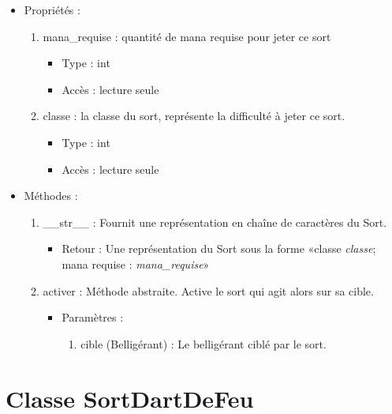 \documentclass[12pt,pdftex,oneside]{article}
\begin{document}
  \begin{itemize}
  \item Propriétés : 
    \begin{enumerate}
    \item mana\_requise : quantité de mana requise pour jeter ce sort
          \begin{itemize}
          \item Type : int
          \item Accès : lecture seule
          \end{itemize}
    \item classe : la classe du sort, représente la difficulté à jeter ce sort.
          \begin{itemize}
          \item Type : int
          \item Accès : lecture seule
          \end{itemize}

    \end{enumerate}

  \item Méthodes : 

    \begin{enumerate}
    \item __str__ : Fournit une représentation en chaîne de caractères du Sort.
      \begin{itemize}
      \item Retour : Une représentation du Sort sous la forme «classe \emph{classe}; mana requise : \emph{mana_requise}»
      \end{itemize}
    \item activer : Méthode abstraite. Active le sort qui agit alors sur sa cible.
      \begin{itemize}
      \item Paramètres : 
        \begin{enumerate}
        \item cible (Belligérant) : Le belligérant ciblé par le sort.
        \end{enumerate}
      \end{itemize}
    \end{enumerate}

  \end{itemize}

  \section {Classe SortDartDeFeu}
\end{document}
